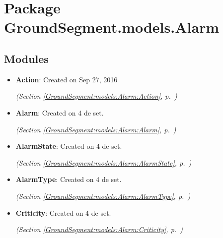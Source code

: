 %
%
%


\section{Package GroundSegment.models.Alarm}

    \label{GroundSegment:models:Alarm}


\subsection{Modules}

\begin{itemize}
\setlength{\parskip}{0ex}
\item \textbf{Action}: Created on Sep 27, 2016



  \textit{(Section \ref{GroundSegment:models:Alarm:Action}, p.~\pageref{GroundSegment:models:Alarm:Action})}

\item \textbf{Alarm}: Created on 4 de set.



  \textit{(Section \ref{GroundSegment:models:Alarm:Alarm}, p.~\pageref{GroundSegment:models:Alarm:Alarm})}

\item \textbf{AlarmState}: Created on 4 de set.



  \textit{(Section \ref{GroundSegment:models:Alarm:AlarmState}, p.~\pageref{GroundSegment:models:Alarm:AlarmState})}

\item \textbf{AlarmType}: Created on 4 de set.



  \textit{(Section \ref{GroundSegment:models:Alarm:AlarmType}, p.~\pageref{GroundSegment:models:Alarm:AlarmType})}

\item \textbf{Criticity}: Created on 4 de set.



  \textit{(Section \ref{GroundSegment:models:Alarm:Criticity}, p.~\pageref{GroundSegment:models:Alarm:Criticity})}

\end{itemize}

